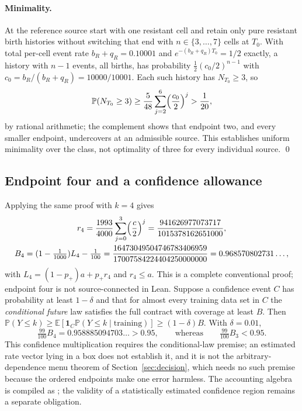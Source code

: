 \documentclass[11pt,a4paper]{article}
\theoremstyle{plain}
\theoremstyle{definition}
\theoremstyle{remark}
\newcommand{\PP}{\mathbb P}
\newcommand{\EE}{\mathbb E}
\newcommand{\ind}{\mathbf 1}
\begin{document}
\paragraph{Minimality.} At the reference source start with one resistant cell and retain only pure resistant birth histories without switching that end with $n\in\{3,\dots,7\}$ cells at $T_0$. With total per-cell event rate $b_R+q_R=0.10001$ and $e^{-(b_R+q_R)T_0}=1/2$ exactly, a history with $n-1$ events, all births, has probability $\tfrac12(c_0/2)^{n-1}$ with $c_0=b_R/(b_R+q_R)=10000/10001$. Each such history has $N_{T_0}\ge3$, so
\begin{equation}\label{eq:min}
\PP(N_{T_0}\ge3)\ge\frac5{48}\sum_{j=2}^6\Bigl(\frac{c_0}2\Bigr)^j>\frac1{20},
\end{equation}
by rational arithmetic; the complement shows that endpoint two, and every smaller endpoint, undercovers at an admissible source. This establishes uniform minimality over the class, not optimality of three for every individual source. \qed

\subsection{Endpoint four and a confidence allowance}
Applying the same proof with $k=4$ gives
\begin{equation}\label{eq:B4}
\begin{gathered}
r_4=\frac{1993}{4000}\sum_{j=0}^3\Bigl(\frac c2\Bigr)^j=\frac{941626977073717}{1015378162651000},\\
B_4=(1-\tfrac1{1000})L_4-\tfrac1{100}=\frac{16473049504746783406959}{17007584224404250000000}=0.968570802731\ldots,
\end{gathered}
\end{equation}
with $L_4=(1-p_+)a+p_+r_4$ and $r_4\le a$. This is a complete conventional proof; endpoint four is not source-connected in Lean. Suppose a confidence event $C$ has probability at least $1-\delta$ and that for almost every training data set in $C$ the \emph{conditional future} law satisfies the full contract with coverage at least $B$. Then $\PP(Y\le k)\ge\EE[\ind_C\PP(Y\le k\mid\text{training})]\ge(1-\delta)B$. With $\delta=0.01$,
\begin{equation}\label{eq:B4conf}
\tfrac{99}{100}B_4=0.958885094703\ldots>0.95,\qquad\text{whereas}\qquad \tfrac{99}{100}B_3<0.95 .
\end{equation}
This confidence multiplication requires the conditional-law premise; an estimated rate vector lying in a box does not establish it, and it is not the arbitrary-dependence menu theorem of Section~\ref{sec:decision}, which needs no such premise because the ordered endpoints make one error harmless. The accounting algebra is compiled as ; the validity of a statistically estimated confidence region remains a separate obligation.
\end{document}
